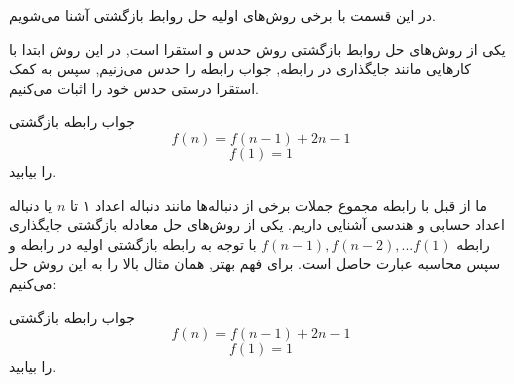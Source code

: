 \p
در این قسمت با برخی روش‌های اولیه حل روابط بازگشتی آشنا می‌شویم.

یکی از روش‌های حل روابط بازگشتی روش حدس و استقرا است, در این روش ابتدا با کارهایی مانند جایگذاری در رابطه, جواب رابطه را حدس می‌زنیم, سپس به کمک استقرا درستی حدس خود را اثبات می‌کنیم.

\begin{PROBLEM}
    \p
    جواب رابطه بازگشتی
    $$f(n)=f(n-1)+2n-1$$
    $$f(1)=1$$
    را بیابید.

 \end{PROBLEM}
 
 \p
 ما از قبل با رابطه مجموع جملات برخی از دنباله‌ها مانند دنباله اعداد ۱ تا 
$n$
 یا دنباله اعداد حسابی و هندسی
 آشنایی داریم. یکی از روش‌های حل معادله بازگشتی جایگذاری رابطه 
 $f(n-1), f(n-2), ...f(1)$
 با توجه به رابطه بازگشتی اولیه در رابطه و سپس محاسبه عبارت حاصل است.
 برای فهم بهتر, همان مثال بالا را به این روش حل می‌کنیم:
 \begin{PROBLEM}
    \p
    جواب رابطه بازگشتی 
    $$f(n)=f(n-1)+2n-1$$
    $$f(1)=1$$
    را بیابید.

 \end{PROBLEM}
 